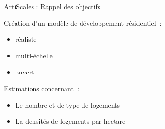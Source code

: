\documentclass[xcolor=table]{beamer}
\begin{document}
\begin{frame}{ArtiScales : Rappel des objectifs}
		\begin{block}{}
		Création d'un modèle de développement résidentiel~:
		\begin{itemize}
			\small
			\item réaliste %
			\item multi-échelle %
			\item ouvert %
		\end{itemize}
	\end{block}
\begin{block}{}
	Estimations concernant~:
	\begin{itemize}
		\item Le nombre et de type de logements
		\item La densités de logements par hectare
	\end{itemize}
\end{block}
\end{frame}
\end{document}
